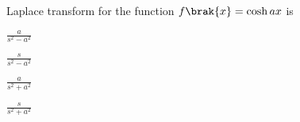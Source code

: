 \item Laplace transform for the function $f\brak{x}=\cosh{ax}$ is

\hfill{}
\begin{enumerate}
\begin{multicols}{4}
\item $\frac{a}{s^2-a^2}$
\item $\frac{s}{s^2-a^2}$
\item $\frac{a}{s^2+a^2}$
\item $\frac{s}{s^2+a^2}$
\end{multicols}
\end{enumerate}

